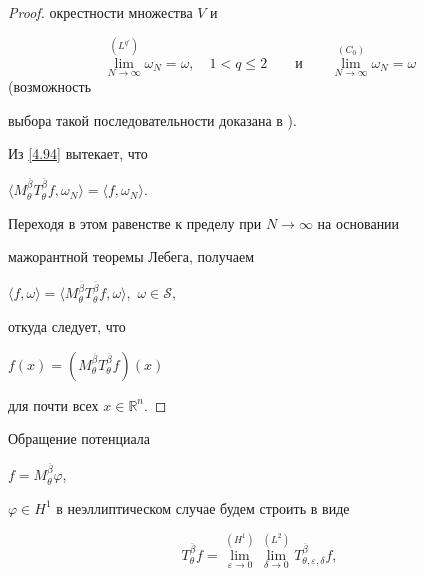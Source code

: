 \begin{proof}
окрестности множества $V$ и

$$\lim\limits^{(L^{q'})}_{N\to \infty}\omega_N=\omega,\quad 1<q\leq2 \qquad\mbox{и}\qquad

  \lim\limits^{(C_0)}_{N\to \infty}\omega_N=\omega$$ (возможность

выбора такой последовательности доказана в \cite[\S 3]{b14}).



Из \eqref{4.94} вытекает, что

$

  \langle M_\theta^{\overline{\beta}}T_\theta^{\overline{\beta}}f,

 \omega_N\rangle= \langle f, \omega_N\rangle.

$

Переходя в этом равенстве к пределу при $N\to\infty$ на основании

мажорантной теоремы Лебега, получаем

$

\langle f,\omega\rangle= \langle M_\theta^{\overline{\beta}}T_\theta^{\overline{\beta}}

f,

 \omega\rangle,$ $\omega\in {\mathcal S},

$

откуда следует, что

$

f(x)=(M_\theta^{\overline{\beta}}T_\theta^{\overline{\beta}}f)(x)\nonumber

$

для почти всех $x\in {\mathbb R^n}$.

\end{proof}



\smallskip




Обращение потенциала

$f=M_{\theta}^{\overline{\beta}}\varphi$,

$\varphi\in H^1$ в неэллиптическом случае будем строить в виде

\begin{equation}\label{2.016}

 T_\theta^{\overline{\beta}}f=\lim_{\varepsilon\to 0}^{(H^{1})}

 \lim_{\delta\to 0}^{(L^2)}

 T_{\theta,\varepsilon,\delta}^{\overline{\beta}}f,

\end{equation}

